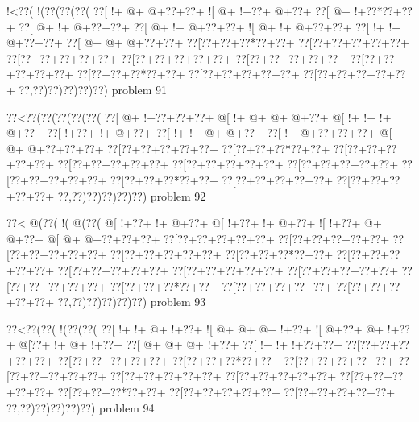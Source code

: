 \vbox{\vbox{\goo
\- !<\0??(\- !(\0??(\0??(\0??(
\0??[\- !+\- @+\- @+\0??+\0??+
\- ![\- @+\- !+\0??+\- @+\0??+
\0??[\- @+\- !+\0??*\0??+\0??+
\0??[\- @+\- !+\- @+\0??+\0??+
\0??[\- @+\- !+\- @+\0??+\0??+
\- ![\- @+\- !+\- @+\0??+\0??+
\0??[\- !+\- !+\- @+\0??+\0??+
\0??[\- @+\- @+\- @+\0??+\0??+
\0??[\0??+\0??+\0??*\0??+\0??+
\0??[\0??+\0??+\0??+\0??+\0??+
\0??[\0??+\0??+\0??+\0??+\0??+
\0??[\0??+\0??+\0??+\0??+\0??+
\0??[\0??+\0??+\0??+\0??+\0??+
\0??[\0??+\0??+\0??+\0??+\0??+
\0??[\0??+\0??+\0??*\0??+\0??+
\0??[\0??+\0??+\0??+\0??+\0??+
\0??[\0??+\0??+\0??+\0??+\0??+
\0??,\0??)\0??)\0??)\0??)\0??)
}
\hfil problem 91\hfil\break
}

\vbox{\vbox{\goo
\0??<\0??(\0??(\0??(\0??(\0??(
\0??[\- @+\- !+\0??+\0??+\0??+
\- @[\- !+\- @+\- @+\- @+\0??+
\- @[\- !+\- !+\- !+\- @+\0??+
\0??[\- !+\0??+\- !+\- @+\0??+
\0??[\- !+\- !+\- @+\- @+\0??+
\0??[\- !+\- @+\0??+\0??+\0??+
\- @[\- @+\- @+\0??+\0??+\0??+
\0??[\0??+\0??+\0??+\0??+\0??+
\0??[\0??+\0??+\0??*\0??+\0??+
\0??[\0??+\0??+\0??+\0??+\0??+
\0??[\0??+\0??+\0??+\0??+\0??+
\0??[\0??+\0??+\0??+\0??+\0??+
\0??[\0??+\0??+\0??+\0??+\0??+
\0??[\0??+\0??+\0??+\0??+\0??+
\0??[\0??+\0??+\0??*\0??+\0??+
\0??[\0??+\0??+\0??+\0??+\0??+
\0??[\0??+\0??+\0??+\0??+\0??+
\0??,\0??)\0??)\0??)\0??)\0??)
}
\hfil problem 92\hfil\break
}

\vbox{\vbox{\goo
\0??<\- @(\0??(\- !(\- @(\0??(
\- @[\- !+\0??+\- !+\- @+\0??+
\- @[\- !+\0??+\- !+\- @+\0??+
\- ![\- !+\0??+\- @+\- @+\0??+
\- @[\- @+\- @+\0??+\0??+\0??+
\0??[\0??+\0??+\0??+\0??+\0??+
\0??[\0??+\0??+\0??+\0??+\0??+
\0??[\0??+\0??+\0??+\0??+\0??+
\0??[\0??+\0??+\0??+\0??+\0??+
\0??[\0??+\0??+\0??*\0??+\0??+
\0??[\0??+\0??+\0??+\0??+\0??+
\0??[\0??+\0??+\0??+\0??+\0??+
\0??[\0??+\0??+\0??+\0??+\0??+
\0??[\0??+\0??+\0??+\0??+\0??+
\0??[\0??+\0??+\0??+\0??+\0??+
\0??[\0??+\0??+\0??*\0??+\0??+
\0??[\0??+\0??+\0??+\0??+\0??+
\0??[\0??+\0??+\0??+\0??+\0??+
\0??,\0??)\0??)\0??)\0??)\0??)
}
\hfil problem 93\hfil\break
}

\vbox{\vbox{\goo
\0??<\0??(\0??(\- !(\0??(\0??(
\0??[\- !+\- !+\- @+\- !+\0??+
\- ![\- @+\- @+\- @+\- !+\0??+
\- ![\- @+\0??+\- @+\- !+\0??+
\- @[\0??+\- !+\- @+\- !+\0??+
\0??[\- @+\- @+\- @+\- !+\0??+
\0??[\- !+\- !+\- !+\0??+\0??+
\0??[\0??+\0??+\0??+\0??+\0??+
\0??[\0??+\0??+\0??+\0??+\0??+
\0??[\0??+\0??+\0??*\0??+\0??+
\0??[\0??+\0??+\0??+\0??+\0??+
\0??[\0??+\0??+\0??+\0??+\0??+
\0??[\0??+\0??+\0??+\0??+\0??+
\0??[\0??+\0??+\0??+\0??+\0??+
\0??[\0??+\0??+\0??+\0??+\0??+
\0??[\0??+\0??+\0??*\0??+\0??+
\0??[\0??+\0??+\0??+\0??+\0??+
\0??[\0??+\0??+\0??+\0??+\0??+
\0??,\0??)\0??)\0??)\0??)\0??)
}
\hfil problem 94\hfil\break
}

